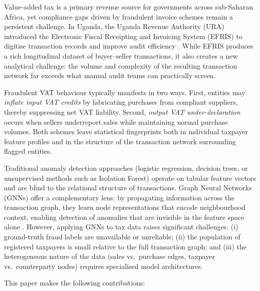 \documentclass[10pt,twocolumn]{article}
\begin{document}
Value-added tax is a primary revenue source for governments across sub-Saharan
Africa, yet compliance gaps driven by fraudulent invoice schemes remain a
persistent challenge. In Uganda, the Uganda Revenue Authority (URA) introduced
the Electronic Fiscal Receipting and Invoicing System (EFRIS) to digitise
transaction records and improve audit efficiency \cite{ura2019efris}. While
EFRIS produces a rich longitudinal dataset of buyer--seller transactions, it
also creates a new analytical challenge: the volume and complexity of the
resulting transaction network far exceeds what manual audit teams can
practically screen.

Fraudulent VAT behaviour typically manifests in two ways. First, entities may
\emph{inflate input VAT credits} by fabricating purchases from compliant
suppliers, thereby suppressing net VAT liability. Second, \emph{output VAT
under-declaration} occurs when sellers underreport sales while maintaining
normal purchase volumes. Both schemes leave statistical fingerprints both in
individual taxpayer feature profiles and in the structure of the transaction
network surrounding flagged entities.

Traditional anomaly detection approaches (logistic regression, decision trees,
or unsupervised methods such as Isolation Forest) operate on tabular feature
vectors and are blind to the relational structure of transactions. Graph Neural
Networks (GNNs) \cite{scarselli2009gnn} offer a complementary lens: by
propagating information across the transaction graph, they learn node
representations that encode neighbourhood context, enabling detection of
anomalies that are invisible in the feature space alone \cite{akoglu2015graph}. However, applying GNNs to tax data raises
significant challenges: (i) ground-truth fraud labels are unavailable or
unreliable; (ii) the population of registered taxpayers is small relative to
the full transaction graph; and (iii) the heterogeneous nature of the data
(sales vs.\ purchase edges, taxpayer vs.\ counterparty nodes) requires
specialised model architectures.

This paper makes the following contributions:
\end{document}
